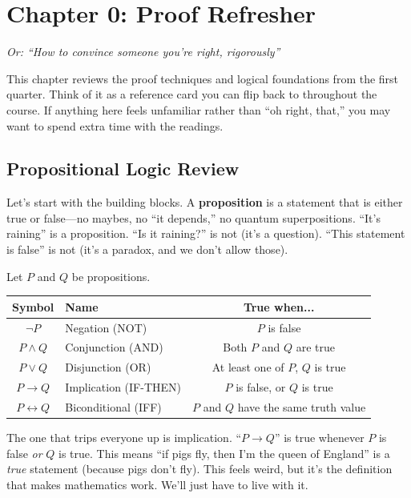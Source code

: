 \section{Chapter 0: Proof Refresher}

\textit{Or: ``How to convince someone you're right, rigorously''}

This chapter reviews the proof techniques and logical foundations from the first quarter. Think of it as a reference card you can flip back to throughout the course. If anything here feels unfamiliar rather than ``oh right, that,'' you may want to spend extra time with the readings.

\subsection*{Propositional Logic Review}

Let's start with the building blocks. A \textbf{proposition} is a statement that is either true or false---no maybes, no ``it depends,'' no quantum superpositions. ``It's raining'' is a proposition. ``Is it raining?'' is not (it's a question). ``This statement is false'' is not (it's a paradox, and we don't allow those).

\begin{definition}
Let $P$ and $Q$ be propositions.

\begin{center}
\begin{tabular}{clc}
\textbf{Symbol} & \textbf{Name} & \textbf{True when...} \\
\hline
$\neg P$ & Negation (NOT) & $P$ is false \\
$P \land Q$ & Conjunction (AND) & Both $P$ and $Q$ are true \\
$P \lor Q$ & Disjunction (OR) & At least one of $P$, $Q$ is true \\
$P \to Q$ & Implication (IF-THEN) & $P$ is false, or $Q$ is true \\
$P \leftrightarrow Q$ & Biconditional (IFF) & $P$ and $Q$ have the same truth value \\
\end{tabular}
\end{center}
\end{definition}

The one that trips everyone up is implication. ``$P \to Q$'' is true whenever $P$ is false \emph{or} $Q$ is true. This means ``if pigs fly, then I'm the queen of England'' is a \emph{true} statement (because pigs don't fly). This feels weird, but it's the definition that makes mathematics work. We'll just have to live with it.

